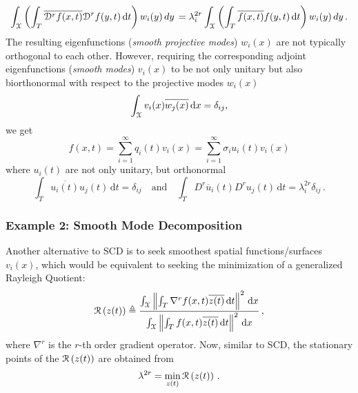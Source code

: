 \documentclass[10pt]{article}
\newcommand{\norm}[1]{\left\Vert#1\right\Vert}
\begin{document}
\begin{equation}
    \int_{\cal X} \left(\int_T \overline{{\cal D}^{r}  f(x,t)} {\cal D}^{r}  f(y,t)\, \mathrm{d}t\right)  w_i(y)  \, dy \, =\lambda_{i}^{2r}  \int_{\cal X} \left(\int_T  \overline{f(x,t)}  f(y,t)\, \mathrm{d}t\right)  w_i(y)  \, dy\,.
\end{equation}
The resulting eigenfunctions ({\em smooth projective modes}) $w_i(x)$ are not typically orthogonal to each other. However, requiring the corresponding adjoint eigenfunctions ({\em smooth modes}) $v_i(x)$ to be not only unitary but also biorthonormal with respect to the projective modes $w_i(x)$
\begin{equation}
\int_{\cal X} v_i(x) \overline{ w_j(x)}\,  \mathrm{d} x = \delta_{ij},
\end{equation}
we get
\begin{equation}
     f(x,t) =\sum_{i=1}^\infty q_i(t) v_i(x) = \sum_{i=1}^\infty \sigma_{i} u_i(t) v_i(x)
\end{equation}
where $u_i(t)$ are not only unitary, but orthonormal
\begin{equation}
\int_T \overline {u_i(t)} u_j(t)\,  \mathrm{d} t = \delta_{ij} \quad \mathrm{and} \quad 
\int_T D^r \overline u_i(t) D^r u_j(t)\,  \mathrm{d} t = \lambda^{2r}_i \delta_{ij}\,.
\end{equation}

\subsubsection{Example 2: Smooth Mode Decomposition}

Another alternative to SCD is to seek smoothest spatial functions/surfaces $v_i(x)$, 
which would be equivalent to seeking the minimization of a generalized Rayleigh Quotient:
\begin{equation}
    {\cal R}\left(z(t)\right) \triangleq
        \frac{
    \int_{\cal X} \norm{ 
    \int_T \nabla^{r}  f(x,t) \overline {z(t)}\,\mathrm{d} t
    }^2 \, \mathrm{d}x
    }{
    \int_{\cal X} \norm{
    \int_T f(x,t) \overline {z(t)}\, \mathrm{d} t
    }^2 \, \mathrm{d} x
    }\,,
\end{equation}
where $\nabla^{r}$ is the $r$-th order gradient operator. 
Now, similar to SCD, the stationary points of the ${\cal R}\left(z(t)\right)$ are obtained from
\begin{equation}
    \lambda^{2r} = \underset{z(t)}{\min}\, {\cal R}\left(z(t)\right)\,.
\end{equation}
\end{document}
